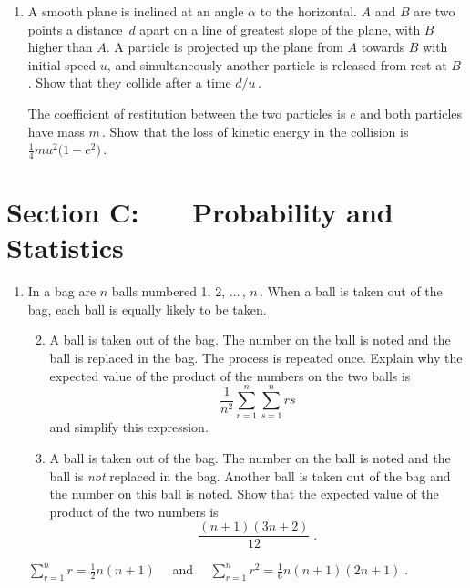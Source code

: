 \documentclass[a4, 11pt]{report}
\newlength{\qspace}
\newcounter{qnumber}
\newenvironment{question}%
 {\vspace{\qspace}
  \begin{enumerate}[\bfseries 1\quad][10]%
    \setcounter{enumi}{\value{qnumber}}%
    \item%
 }
{
  \end{enumerate}
  \filbreak
  \stepcounter{qnumber}
 }
\newenvironment{questionparts}[1][1]%
 {
  \begin{enumerate}[\bfseries (i)]%
    \setcounter{enumii}{#1}
    \addtocounter{enumii}{-1}
    \setlength{\itemsep}{5mm}
    \setlength{\parskip}{8pt}
 }
 {
  \end{enumerate}
 }
\newcommand{\ds}{\displaystyle}
\begin{document}

\begin{question}
A smooth plane is inclined at an angle $\alpha$ to the horizontal.
$A$ and $B$ are two points a distance~$d$ apart
on a line of greatest slope of the  plane, with $B$ higher than $A$. 
A particle is projected up the plane from $A$ towards $B$ with 
initial speed  $u$, and simultaneously another particle 
is released from rest at $B\,$. Show that they collide after 
a time $\displaystyle {d /u}\,$.

The coefficient of restitution between the two particles is $e$ and both
particles have mass $m\,$. 
Show that the loss of kinetic energy in the collision is 
$\frac14 {m u^2 \big( 1 - e^2 \big) }\,$.
\end{question}
	

	
	\newpage
\section*{Section C: \ \ \ Probability and Statistics}


\begin{question}
In a bag are $n$ balls numbered 1, 2, $\ldots\,$, $n\,$. When a ball is taken
out of the bag, each ball is equally likely to be taken. 
\begin{questionparts}
\item A ball is taken out of the bag. The number on the ball is noted
and the ball is replaced in the bag. The process is repeated once.
Explain why the expected value of the product of the numbers on the two balls
is 
\[
\frac 1 {n^2}  \sum_{r=1}^n\sum_{s=1}^n rs 
\]
and simplify this expression.

\item
 A ball is taken out of the bag. The number on the ball is noted
and the ball is {\sl not} replaced in the bag. Another ball is taken out of the 
bag and the number on this ball is noted.
Show that the expected value of the product of the two numbers is 
\[
\frac{(n+1)(3n+2)}{12}\;.
\]
\end{questionparts}

 $\ds\sum_{r=1}^n r = \frac12 n(n+1)$ \ \ and \  \
 $\ds\sum_{r=1}^n r^2 = \frac16 n(n+1)(2n+1)\;$.

\end{question}
\end{document}
